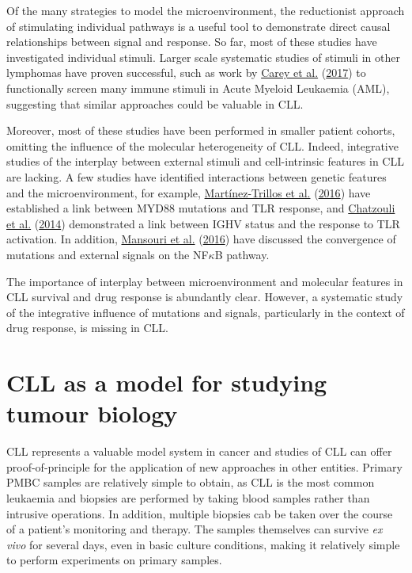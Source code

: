 \documentclass[11pt, a4paper, twosided]{book}
\begin{document}
Of the many strategies to model the microenvironment, the reductionist approach of stimulating individual pathways is a useful tool to demonstrate direct causal relationships between signal and response. So far, most of these studies have investigated individual stimuli. Larger scale systematic studies of stimuli in other lymphomas have proven successful, such as work by \protect\hyperlink{ref-Carey2017}{Carey et al.} (\protect\hyperlink{ref-Carey2017}{2017}) to functionally screen many immune stimuli in Acute Myeloid Leukaemia (AML), suggesting that similar approaches could be valuable in CLL.

Moreover, most of these studies have been performed in smaller patient cohorts, omitting the influence of the molecular heterogeneity of CLL. Indeed, integrative studies of the interplay between external stimuli and cell-intrinsic features in CLL are lacking. A few studies have identified interactions between genetic features and the microenvironment, for example, \protect\hyperlink{ref-Martinez2016}{Martínez-Trillos et al.} (\protect\hyperlink{ref-Martinez2016}{2016}) have established a link between MYD88 mutations and TLR response, and \protect\hyperlink{ref-Chatzouli2014}{Chatzouli et al.} (\protect\hyperlink{ref-Chatzouli2014}{2014}) demonstrated a link between IGHV status and the response to TLR activation. In addition, \protect\hyperlink{ref-Mansouri2016}{Mansouri et al.} (\protect\hyperlink{ref-Mansouri2016}{2016}) have discussed the convergence of mutations and external signals on the NF\(\kappa\)B pathway.

The importance of interplay between microenvironment and molecular features in CLL survival and drug response is abundantly clear. However, a systematic study of the integrative influence of mutations and signals, particularly in the context of drug response, is missing in CLL.

\hypertarget{CLL-model-intro}{%
\section{CLL as a model for studying tumour biology}\label{CLL-model-intro}}

CLL represents a valuable model system in cancer and studies of CLL can offer proof-of-principle for the application of new approaches in other entities. Primary PMBC samples are relatively simple to obtain, as CLL is the most common leukaemia and biopsies are performed by taking blood samples rather than intrusive operations. In addition, multiple biopsies cab be taken over the course of a patient's monitoring and therapy. The samples themselves can survive \emph{ex vivo} for several days, even in basic culture conditions, making it relatively simple to perform experiments on primary samples.
\end{document}
